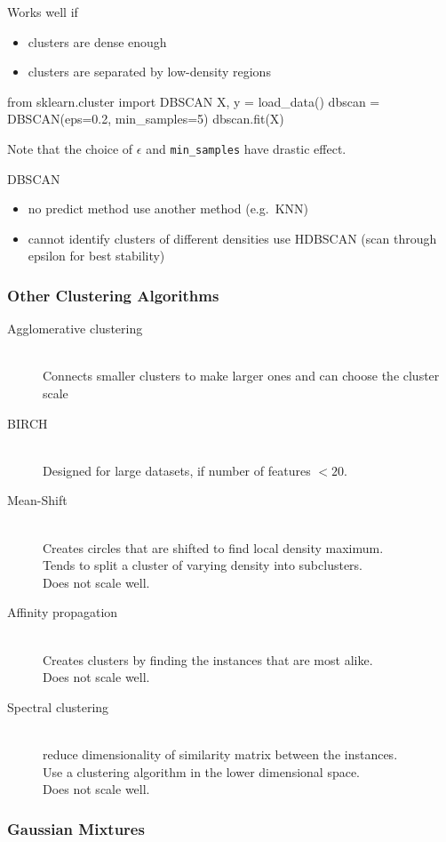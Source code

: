Works well if
\begin{itemize}
    \item clusters are dense enough
    \item clusters are separated by low-density regions
\end{itemize}

\begin{python}
    from sklearn.cluster import DBSCAN
    X, y = load_data()
    dbscan = DBSCAN(eps=0.2, min_samples=5)
    dbscan.fit(X)
\end{python}
Note that the choice of $\epsilon$ and \verb;min_samples; have drastic effect.

DBSCAN
\begin{itemize}
    \item no predict method \Arrow use another method (e.g.\ KNN)
    \item cannot identify clusters of different densities \arrow use HDBSCAN (scan through epsilon for best stability)
\end{itemize}

\subsubsection{Other Clustering Algorithms}
\begin{description}
    \item[Agglomerative clustering] \hfill\\
        Connects smaller clusters to make larger ones and can choose the cluster scale
    \item[BIRCH] \hfill\\
        Designed for large datasets, if number of features $<20$.
    \item[Mean-Shift] \hfill\\
        Creates circles that are shifted to find local density maximum.\\
        Tends to split a cluster of varying density into subclusters.\\
        Does not scale well.
    \item[Affinity propagation] \hfill\\
        Creates clusters by finding the instances that are most alike.\\
        Does not scale well.
    \item[Spectral clustering] \hfill\\
        reduce dimensionality of similarity matrix between the instances.\\
        Use a clustering algorithm in the lower dimensional space.\\
        Does not scale well.
\end{description}


\subsubsection{Gaussian Mixtures}

